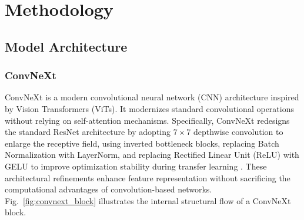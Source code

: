 \section{Methodology}

\subsection{Model Architecture}

\subsubsection{ConvNeXt}

ConvNeXt is a modern convolutional neural network (CNN) architecture inspired by Vision Transformers (ViTs).
It modernizes standard convolutional operations without relying on self-attention mechanisms.
Specifically, ConvNeXt redesigns the standard ResNet architecture by adopting $7 \times 7$ depthwise convolution to enlarge the receptive field, using inverted bottleneck blocks, replacing Batch Normalization with LayerNorm, and replacing Rectified Linear Unit (ReLU) with GELU to improve optimization stability during transfer learning \cite{Liu2022}.
These architectural refinements enhance feature representation without sacrificing the computational advantages of convolution-based networks.
Fig.~\ref{fig:convnext_block} illustrates the internal structural flow of a ConvNeXt block.


